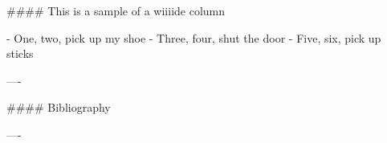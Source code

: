 \documentclass{beamer}
\begin{document}
\begin{frame}[fragile]
\begin{markdown}

#### This is a sample of a wiiiide column

- One, two, pick up my shoe
- Three, four, shut the door
- Five, six, pick up sticks

----

#### Bibliography




----

\end{markdown}

\end{frame}
\end{document}
